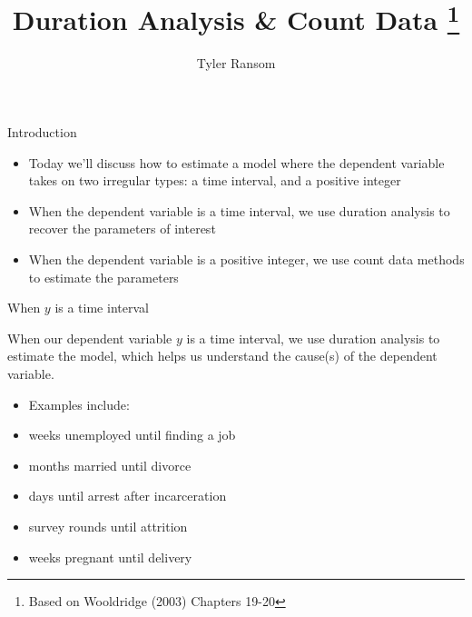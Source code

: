 \documentclass[english,xcolor=dvipsnames]{beamer}
\begin{document}
\begin{frame}

\title{Duration Analysis \& Count Data%
\thanks{Based on Wooldridge (2003) Chapters 19-20%
}}


\author{Tyler Ransom}



\titlepage

\end{frame}


\begin{frame}{Introduction}
\begin{itemize}
\item Today we'll discuss how to estimate a model where the dependent variable
takes on two irregular types: a time interval, and a positive integer
\item When the dependent variable is a time interval, we use duration analysis
to recover the parameters of interest
\item When the dependent variable is a positive integer, we use count data
methods to estimate the parameters
\end{itemize}

\end{frame}


\begin{frame}{When $y$ is a time interval}

When our dependent variable $y$ is a time interval, we use duration
analysis to estimate the model, which helps us understand the cause(s)
of the dependent variable. 
\begin{itemize}
\item Examples include:
\item weeks unemployed until finding a job
\item months married until divorce
\item days until arrest after incarceration
\item survey rounds until attrition
\item weeks pregnant until delivery
\end{itemize}

\end{frame}
\end{document}
